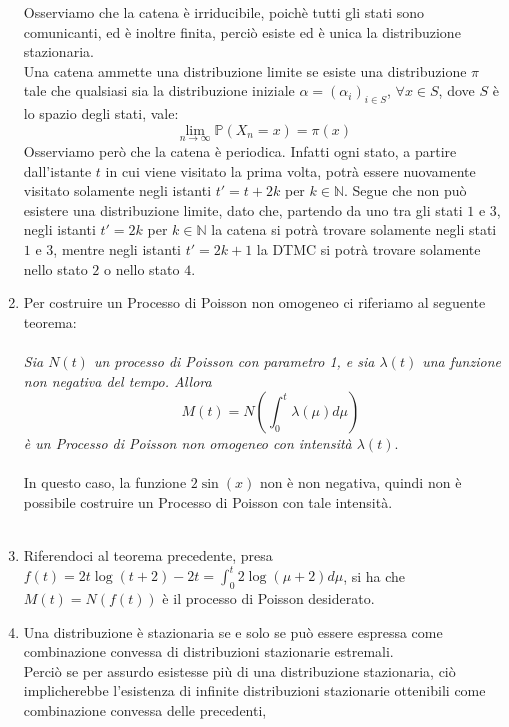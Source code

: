 \documentclass[
	12pt, %
]{fphw}
\begin{document}
\begin{enumerate}
	Osserviamo che la catena è irriducibile, poichè tutti gli stati sono comunicanti, ed è inoltre finita, perciò esiste ed è unica la distribuzione stazionaria.\\
	Una catena ammette una distribuzione limite se esiste una distribuzione $\pi$ tale che 
	qualsiasi sia la distribuzione iniziale $\alpha = (\alpha_i)_{i \in S}$, $\forall x \in S$, dove $S$ è lo spazio degli stati, vale:
	\begin{equation*}
		\lim_{n \to \infty}  \mathbb{P} (X_n = x) = \pi (x)
	\end{equation*}
	Osserviamo però che la catena è periodica. Infatti ogni stato, a partire dall'istante $t$ in cui viene visitato la prima volta, 
	potrà essere nuovamente visitato solamente negli istanti $t' = t + 2k$ per $k\in \mathbb{N}$. Segue che non può esistere una distribuzione limite, 
	dato che, partendo da uno tra gli stati $1$ e $3$, negli istanti $t' = 2k$ per $k \in \mathbb{N}$ la catena si potrà trovare solamente negli stati $1$ e $3$, mentre negli
	istanti $t' = 2k + 1$ la DTMC si potrà trovare solamente nello stato $2$ o nello stato $4$.
	\item Per costruire un Processo di Poisson non omogeneo ci riferiamo al seguente teorema:\\
	\\
	\null\quad \textit{Sia $N(t)$ un processo di Poisson con parametro 1, e sia $\lambda(t)$ una funzione\\
	\null\quad non negativa del tempo. Allora
	\begin{equation*}
		\quad M(t) = N(\int_0^t \lambda(\mu)d\mu)
	\end{equation*}
	\null\quad è un Processo di Poisson non omogeneo con intensità $\lambda(t)$}.\\
	\\
	In questo caso, la funzione $2\sin(x)$ non è non negativa, quindi non è possibile costruire un Processo di Poisson con tale intensità.\\
	\\
	\item Riferendoci al teorema precedente, presa $f(t) = 2t\log(t+2) - 2t = \int_0^t 2\log(\mu + 2)d\mu$, 
	si ha che $M(t) = N(f(t))$ è il processo di Poisson desiderato.
	\item Una distribuzione è stazionaria se e solo se può essere espressa come combinazione convessa di distribuzioni stazionarie estremali.\\
	Perciò se per assurdo esistesse più di una distribuzione stazionaria, ciò implicherebbe l'esistenza di infinite distribuzioni stazionarie ottenibili come combinazione convessa delle precedenti,

\end{enumerate}
\end{document}
